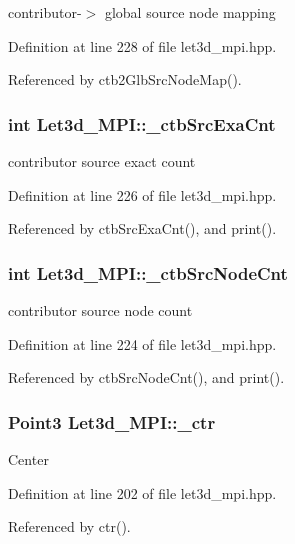 contributor-$>$ global source node mapping 

Definition at line 228 of file let3d\_\-mpi.hpp.

Referenced by ctb2Glb\-Src\-Node\-Map().
\subsubsection{\setlength{\rightskip}{0pt plus 5cm}int {\bf Let3d\_\-MPI::\_\-ctb\-Src\-Exa\-Cnt}\hspace{0.3cm}{\tt  [protected]}}\label{classLet3d__MPI_c93e6379b83b33bdec92506d1db50d04_c93e6379b83b33bdec92506d1db50d04}


contributor source exact count 

Definition at line 226 of file let3d\_\-mpi.hpp.

Referenced by ctb\-Src\-Exa\-Cnt(), and print().
\subsubsection{\setlength{\rightskip}{0pt plus 5cm}int {\bf Let3d\_\-MPI::\_\-ctb\-Src\-Node\-Cnt}\hspace{0.3cm}{\tt  [protected]}}\label{classLet3d__MPI_7b2e5fb51c1d117763cb0181de2dc552_7b2e5fb51c1d117763cb0181de2dc552}


contributor source node count 

Definition at line 224 of file let3d\_\-mpi.hpp.

Referenced by ctb\-Src\-Node\-Cnt(), and print().
\subsubsection{\setlength{\rightskip}{0pt plus 5cm}Point3 {\bf Let3d\_\-MPI::\_\-ctr}\hspace{0.3cm}{\tt  [protected]}}\label{classLet3d__MPI_44a525e9e8f92f514cd56f283ba05f70_44a525e9e8f92f514cd56f283ba05f70}


Center 

Definition at line 202 of file let3d\_\-mpi.hpp.

Referenced by ctr().

